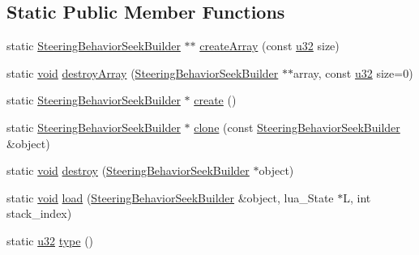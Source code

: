 \subsection*{Static Public Member Functions}
\begin{DoxyCompactItemize}
\item 
static \mbox{\hyperlink{classnjli_1_1_steering_behavior_seek_builder}{Steering\+Behavior\+Seek\+Builder}} $\ast$$\ast$ \mbox{\hyperlink{classnjli_1_1_steering_behavior_seek_builder_aeaf14539fae2b3b3a15d65a89f1397aa}{create\+Array}} (const \mbox{\hyperlink{_util_8h_a10e94b422ef0c20dcdec20d31a1f5049}{u32}} size)
\item 
static \mbox{\hyperlink{_thread_8h_af1e856da2e658414cb2456cb6f7ebc66}{void}} \mbox{\hyperlink{classnjli_1_1_steering_behavior_seek_builder_a79ba169b4b13e84e880349e0a3508355}{destroy\+Array}} (\mbox{\hyperlink{classnjli_1_1_steering_behavior_seek_builder}{Steering\+Behavior\+Seek\+Builder}} $\ast$$\ast$array, const \mbox{\hyperlink{_util_8h_a10e94b422ef0c20dcdec20d31a1f5049}{u32}} size=0)
\item 
static \mbox{\hyperlink{classnjli_1_1_steering_behavior_seek_builder}{Steering\+Behavior\+Seek\+Builder}} $\ast$ \mbox{\hyperlink{classnjli_1_1_steering_behavior_seek_builder_aaf0279e7ceda4c6356b1d7fc6fe19b51}{create}} ()
\item 
static \mbox{\hyperlink{classnjli_1_1_steering_behavior_seek_builder}{Steering\+Behavior\+Seek\+Builder}} $\ast$ \mbox{\hyperlink{classnjli_1_1_steering_behavior_seek_builder_ae08c8e0be2dd37e201a1b0a4414df8f0}{clone}} (const \mbox{\hyperlink{classnjli_1_1_steering_behavior_seek_builder}{Steering\+Behavior\+Seek\+Builder}} \&object)
\item 
static \mbox{\hyperlink{_thread_8h_af1e856da2e658414cb2456cb6f7ebc66}{void}} \mbox{\hyperlink{classnjli_1_1_steering_behavior_seek_builder_abf073de73ba17537c5d3c6b7e6a0a125}{destroy}} (\mbox{\hyperlink{classnjli_1_1_steering_behavior_seek_builder}{Steering\+Behavior\+Seek\+Builder}} $\ast$object)
\item 
static \mbox{\hyperlink{_thread_8h_af1e856da2e658414cb2456cb6f7ebc66}{void}} \mbox{\hyperlink{classnjli_1_1_steering_behavior_seek_builder_a4656eb59c3684a9a2294f58c2b75c0c9}{load}} (\mbox{\hyperlink{classnjli_1_1_steering_behavior_seek_builder}{Steering\+Behavior\+Seek\+Builder}} \&object, lua\+\_\+\+State $\ast$L, int stack\+\_\+index)
\item 
static \mbox{\hyperlink{_util_8h_a10e94b422ef0c20dcdec20d31a1f5049}{u32}} \mbox{\hyperlink{classnjli_1_1_steering_behavior_seek_builder_a01230b068e5944f1dc0370be7982c499}{type}} ()
\end{DoxyCompactItemize}

